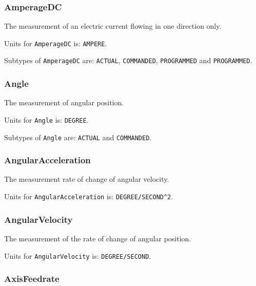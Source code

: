 \subsubsection{AmperageDC}
  \label{sec:AmperageDC}



The measurement of an electric current flowing in one direction only.


Units for \texttt{AmperageDC} is: \texttt{AMPERE}.


Subtypes of \texttt{AmperageDC} are: \texttt{ACTUAL}, \texttt{COMMANDED}, \texttt{PROGRAMMED} and \texttt{PROGRAMMED}. 
\FloatBarrier

\subsubsection{Angle}
  \label{sec:Angle}



The measurement of angular position.


Units for \texttt{Angle} is: \texttt{DEGREE}.


Subtypes of \texttt{Angle} are: \texttt{ACTUAL} and \texttt{COMMANDED}. 
\FloatBarrier

\subsubsection{AngularAcceleration}
  \label{sec:AngularAcceleration}



The measurement rate of change of angular velocity.


Units for \texttt{AngularAcceleration} is: \texttt{DEGREE/SECOND\^{}2}.

\FloatBarrier

\subsubsection{AngularVelocity}
  \label{sec:AngularVelocity}



The measurement of the rate of change of angular position.


Units for \texttt{AngularVelocity} is: \texttt{DEGREE/SECOND}.

\FloatBarrier

\subsubsection{AxisFeedrate}
  \label{sec:AxisFeedrate}



